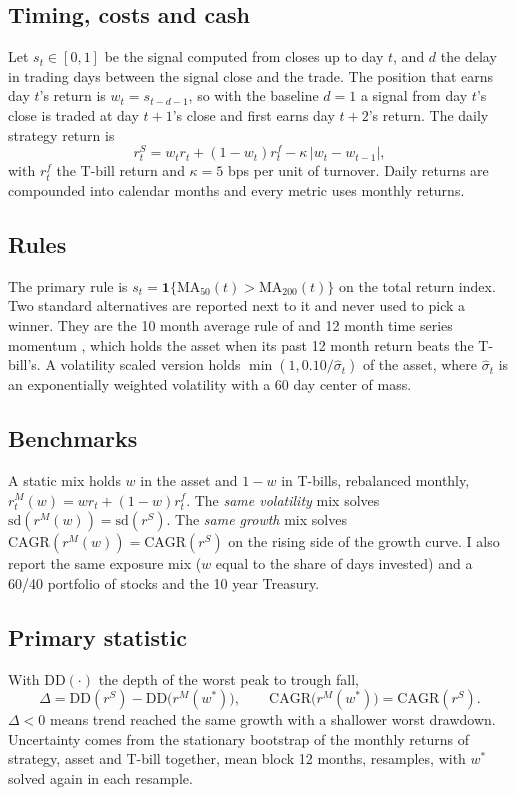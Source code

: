 \documentclass[11pt]{article}
\begin{document}
\subsection{Timing, costs and cash}
Let $s_t\in[0,1]$ be the signal computed from closes up to day $t$, and $d$ the delay in trading days between the signal close and the trade. The position that earns day $t$'s return is $w_t = s_{t-d-1}$, so with the baseline $d=1$ a signal from day $t$'s close is traded at day $t+1$'s close and first earns day $t+2$'s return. The daily strategy return is
\begin{equation}
r^{S}_t = w_t r_t + (1-w_t) r^{f}_t - \kappa\,|w_t-w_{t-1}|,
\end{equation}
with $r^f_t$ the T-bill return and $\kappa=5$ bps per unit of turnover. Daily returns are compounded into calendar months and every metric uses monthly returns.

\subsection{Rules}
The primary rule is $s_t=\mathbf{1}\{\mathrm{MA}_{50}(t)>\mathrm{MA}_{200}(t)\}$ on the total return index. Two standard alternatives are reported next to it and never used to pick a winner. They are the 10 month average rule of \citet{faber} and 12 month time series momentum \citep{mop}, which holds the asset when its past 12 month return beats the T-bill's. A volatility scaled version holds $\min(1, 0.10/\hat\sigma_t)$ of the asset, where $\hat\sigma_t$ is an exponentially weighted volatility with a 60 day center of mass.

\subsection{Benchmarks}
A static mix holds $w$ in the asset and $1-w$ in T-bills, rebalanced monthly, $r^{M}_t(w)=w r_t+(1-w)r^f_t$. The \emph{same volatility} mix solves $\mathrm{sd}(r^M(w))=\mathrm{sd}(r^S)$. The \emph{same growth} mix solves $\mathrm{CAGR}(r^M(w))=\mathrm{CAGR}(r^S)$ on the rising side of the growth curve. I also report the same exposure mix ($w$ equal to the share of days invested) and a 60/40 portfolio of stocks and the 10 year Treasury.

\subsection{Primary statistic}\label{sec:primary}
With $\mathrm{DD}(\cdot)$ the depth of the worst peak to trough fall,
\begin{equation}
\Delta = \mathrm{DD}(r^S) - \mathrm{DD}\big(r^M(w^{*})\big),\qquad \mathrm{CAGR}\big(r^M(w^*)\big)=\mathrm{CAGR}(r^S).
\end{equation}
$\Delta<0$ means trend reached the same growth with a shallower worst drawdown. Uncertainty comes from the stationary bootstrap \citep{politis} of the monthly returns of strategy, asset and T-bill together, mean block 12 months,  resamples, with $w^*$ solved again in each resample.
\end{document}
